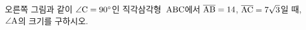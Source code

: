 \noindent\begin{minipage}[t]{0.58\linewidth}\vspace{0pt}\raggedright 오른쪽 그림과 같이 $\angle\mathrm{C}=90^\circ$인 직각삼각형~$\mathrm{ABC}$에서 $\overline{\mathrm{AB}}=14$, $\overline{\mathrm{AC}}=7\sqrt{3}$일 때, $\angle\mathrm{A}$의 크기를 구하시오.\end{minipage}\hfill\begin{minipage}[t]{0.4\linewidth}\vspace{0pt}\centering \resizebox{\ifdim\width>\linewidth\linewidth\else\width\fi}{!}{}\end{minipage}\par

